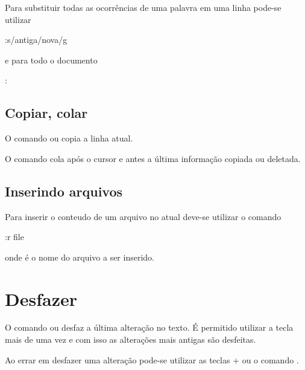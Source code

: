 Para substituir todas as ocorrências de uma palavra em uma linha pode-se utilizar
\begin{code}
    :s/antiga/nova/g
\end{code}
e para todo o documento
\begin{code}
    :%
\end{code}

\subsection{Copiar, colar}
O comando  ou  copia a linha atual.

O comando  cola após o cursor e  antes a última informação copiada ou deletada.

\subsection{Inserindo arquivos}
Para inserir o conteudo de um arquivo no atual deve-se utilizar o comando
\begin{code}
    :r file
\end{code}
onde  é o nome do arquivo a ser inserido.

\section{Desfazer}
O comando  ou  desfaz a última alteração no texto. É permitido utilizar a tecla  mais de uma vez e com isso as alterações mais antigas são desfeitas. 

Ao errar em desfazer uma alteração pode-se utilizar as teclas + ou o comando .
